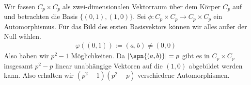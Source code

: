 \begin{solution}
  Wir fassen $C_p \times C_p$ als zwei-dimensionalen Vektorraum über dem Körper $C_p$
  auf und betrachten die Basis $\{(0,1),(1,0)\}$.
  Sei $\phi: C_p \times C_p \rightarrow C_p \times C_p$ ein Automorphismus.
  Für das Bild des ersten Basisvektors können wir alles außer der Null wählen.
  \begin{align*}
    \varphi((0,1)) := (a,b) \neq (0,0)
  \end{align*}
  Also haben wir $p^2 - 1$ Möglichkeiten.
  Da $|\spn\{(a,b)\}| = p$ gibt es in $C_p \times C_p$ insgesamt $p^2 - p$
  linear unabhängige Vektoren auf die $(1,0)$ abgebildet werden kann.
  Also erhalten wir $(p^2 - 1)(p^2 - p)$ verschiedene Automorphismen.
\end{solution}
